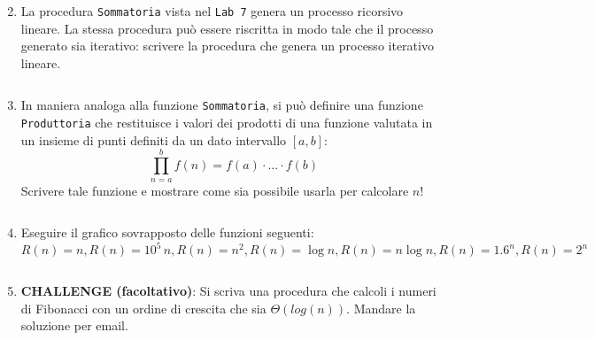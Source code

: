 \documentclass[11pt,a4]{article}
\newcommand{\mybox}[2]{$\quad$\fbox{
\begin{minipage}{#1cm}
\hfill\vspace{#2cm}
\end{minipage}
}}
\begin{document}
\begin{enumerate}
\mybox{15}{3.5}
 
\item La procedura {\tt Sommatoria} vista nel {\tt Lab 7} genera un processo ricorsivo lineare.
La stessa procedura può essere riscritta in modo tale che il processo generato sia iterativo:
scrivere la procedura che genera un processo iterativo lineare.

\mybox{15}{4.5}

\item In maniera analoga alla funzione {\tt Sommatoria}, si può definire una funzione {\tt Produttoria}
che restituisce i valori dei prodotti di una funzione valutata in un insieme di punti definiti da un dato intervallo $[a,b]$:
$$
	\prod_{n=a}^b f(n) = f(a)\cdot ... \cdot f(b)
$$
Scrivere tale funzione e mostrare come sia possibile usarla per calcolare $n!$

\mybox{15}{4.5}

\item Eseguire il grafico sovrapposto delle funzioni seguenti: 
$$R(n)=n, R(n)=10^5\,n, R(n)=n^2, R(n)=\log{n}, R(n)=n\log{n}, R(n)=1.6^n, R(n)=2^n$$

\mybox{15}{4.5}

\item {\bf CHALLENGE (facoltativo)}: Si scriva una procedura che calcoli i numeri di Fibonacci
con un ordine di crescita che sia $\Theta(log(n))$. Mandare la soluzione per email.
\end{enumerate}
\end{document}
